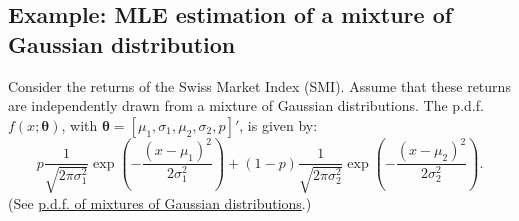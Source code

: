 \documentclass[
  12pt,
]{book}
\theoremstyle{definition}
\theoremstyle{definition}
\theoremstyle{definition}
\theoremstyle{definition}
\theoremstyle{remark}
\begin{document}
\hypertarget{example-mle-estimation-of-a-mixture-of-gaussian-distribution}{%
\subsection{Example: MLE estimation of a mixture of Gaussian distribution}\label{example-mle-estimation-of-a-mixture-of-gaussian-distribution}}

Consider the returns of the Swiss Market Index (SMI). Assume that these returns are independently drawn from a mixture of Gaussian distributions. The p.d.f. \(f(x;\boldsymbol\theta)\), with \(\boldsymbol\theta = [\mu_1,\sigma_1,\mu_2,\sigma_2,p]'\), is given by:
\[
p \frac{1}{\sqrt{2\pi\sigma_1^2}}\exp\left(-\frac{(x - \mu_1)^2}{2\sigma_1^2}\right) + (1-p)\frac{1}{\sqrt{2\pi\sigma_2^2}}\exp\left(-\frac{(x - \mu_2)^2}{2\sigma_2^2}\right).
\]
(See \href{https://jrenne.shinyapps.io/density/}{p.d.f. of mixtures of Gaussian distributions}.)
\end{document}
